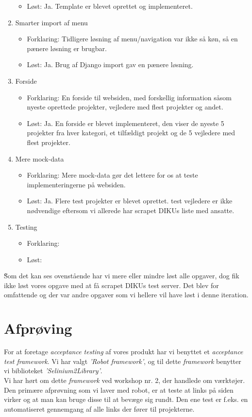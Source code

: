 \documentclass[11pt]{article}
\begin{document}
\begin{enumerate}
\begin{itemize}
        \item Løst: Ja. Template er blevet oprettet og implementeret.
	\end{itemize}
\item Smarter import af menu
	\begin{itemize}
	\item Forklaring: Tidligere løsning af menu/navigation var ikke så køn, så en pænere løsning er brugbar.
        \item Løst: Ja. Brug af Django import gav en pænere løsning.
	\end{itemize}
\item Forside
	\begin{itemize}
	\item Forklaring: En forside til websiden, med forskellig information såsom nyeste oprettede projekter, vejledere med flest projekter og andet.
        \item Løst: Ja. En forside er blevet implementeret, den viser de nyeste 5 projekter fra hver kategori, et tilfældigt projekt og de 5 vejledere med flest projekter.
	\end{itemize}
\item Mere mock-data
	\begin{itemize}
	\item Forklaring: Mere mock-data gør det lettere for os at teste implementeringerne på websiden.
        \item Løst: Ja. Flere test projekter er blevet oprettet. test vejledere er ikke nødvendige eftersom vi allerede har scrapet DIKUs liste med ansatte.
	\end{itemize}
\item Testing
	\begin{itemize}
	\item Forklaring:
        \item Løst:
	\end{itemize}
\end{enumerate}
\~
Som det kan ses ovenstående har vi mere eller mindre løst alle opgaver, dog fik ikke løst vores opgave med at få scrapet DIKUs test server. Det blev for omfattende og der var andre opgaver som vi hellere vil have løst i denne iteration.

\section{Afprøving}
For at foretage \textit{acceptance testing} af vores produkt har vi benyttet et \textit{acceptance test framework}. Vi har valgt \textit{'Robot framework'}, og til dette \textit{framework} benytter vi biblioteket \textit{'Selinium2Library'}. \\
Vi har hørt om dette \textit{framework} ved workshop nr. 2, der handlede om værktøjer.\\
Den primære afprøvning som vi laver med robot, er at teste at links på siden virker og at man kan bruge disse til at bevæge sig rundt. Den ene test er f.eks. en automatiseret gennemgang af alle links der fører til projekterne. \\
\end{document}
